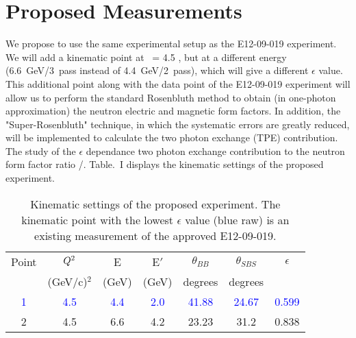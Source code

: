 \section{Proposed Measurements} 
\label{prop}

We propose to use the same experimental setup as the E12-09-019 experiment. We will add a kinematic point at \qsq~= 4.5 \gevcsq, but at a different energy (6.6~GeV/3~pass instead of 4.4~GeV/2~pass), which will give a different $\epsilon$ value. This additional point along with the data point of the E12-09-019 experiment will allow us to perform the standard Rosenbluth method to obtain (in one-photon approximation) the neutron electric and magnetic form factors. In addition, the "Super-Rosenbluth" technique, in which the systematic errors are greatly reduced, will be implemented to calculate  the two photon exchange (TPE) contribution. The study of the $\epsilon$ dependance two photon exchange contribution to the neutron form factor ratio \gen/\gmn. Table.~I displays the kinematic settings of the proposed experiment. 

\begin{table}[h] 
\centering
\begin{tabular}{|c|c|c|c|c|c|c|}
\hline
\small{Point} & $Q\textsuperscript{2}$  & E & E$'$  & $\theta_{BB}$ & $\theta_{SBS}$ & $\epsilon$ \\
& (GeV/c)$^2$ & (GeV) & (GeV)  &\; degrees\; & \; degrees \;  &   \\
\hline
\textcolor{blue}
 1&\textcolor{blue} {4.5} & \textcolor{blue}{4.4} & \textcolor{blue}{2.0} & \textcolor{blue}{41.88}  & \textcolor{blue}{24.67} &\; \textcolor{blue}{0.599} \;\\
\hline
2 & 4.5  &  6.6  &  4.2  & 23.23  &  31.2  &  0.838 \\
\hline
\end{tabular} 
\caption{Kinematic settings of the proposed experiment. The kinematic point with the lowest $\epsilon$ value (blue raw) is an existing measurement of the approved  E12-09-019.}
\label{tab:propkin}
\end{table}

